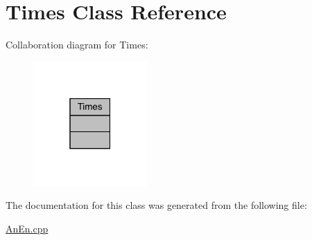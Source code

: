 \hypertarget{class_times}{}\section{Times Class Reference}
\label{class_times}


Collaboration diagram for Times\+:
\nopagebreak
\begin{figure}[H]
\begin{center}
\leavevmode
\includegraphics[width=123pt]{class_times__coll__graph}
\end{center}
\end{figure}


The documentation for this class was generated from the following file\+:\begin{DoxyCompactItemize}
\item 
\mbox{\hyperlink{_an_en_8cpp}{An\+En.\+cpp}}\end{DoxyCompactItemize}
